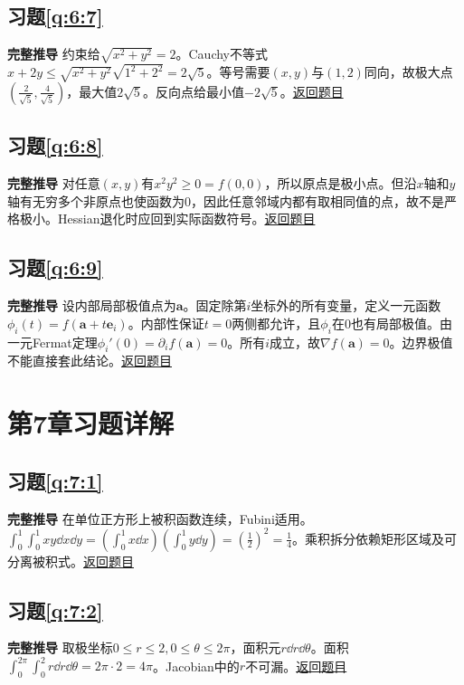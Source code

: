 \subsection*{习题\ref{q:6:7}}\label{a:6:7}\textbf{完整推导} 约束给$\sqrt{x^2+y^2}=2$。Cauchy不等式$x+2y\le\sqrt{x^2+y^2}\sqrt{1^2+2^2}=2\sqrt5$。等号需要$(x,y)$与$(1,2)$同向，故极大点$(\frac{2}{\sqrt5},\frac{4}{\sqrt5})$，最大值$2\sqrt5$。反向点给最小值$-2\sqrt5$。\quad\hyperref[q:6:7]{返回题目}

\subsection*{习题\ref{q:6:8}}\label{a:6:8}\textbf{完整推导} 对任意$(x,y)$有$x^2y^2\ge0=f(0,0)$，所以原点是极小点。但沿$x$轴和$y$轴有无穷多个非原点也使函数为0，因此任意邻域内都有取相同值的点，故不是严格极小。Hessian退化时应回到实际函数符号。\quad\hyperref[q:6:8]{返回题目}

\subsection*{习题\ref{q:6:9}}\label{a:6:9}\textbf{完整推导} 设内部局部极值点为$\bm a$。固定除第$i$坐标外的所有变量，定义一元函数$\phi_i(t)=f(\bm a+t\bm e_i)$。内部性保证$t=0$两侧都允许，且$\phi_i$在0也有局部极值。由一元Fermat定理$\phi_i'(0)=\partial_i f(\bm a)=0$。所有$i$成立，故$\nabla f(\bm a)=0$。边界极值不能直接套此结论。\quad\hyperref[q:6:9]{返回题目}

\section{第7章习题详解}

\subsection*{习题\ref{q:7:1}}\label{a:7:1}\textbf{完整推导} 在单位正方形上被积函数连续，Fubini适用。$\int_0^1\int_0^1xy\dd x\dd y=(\int_0^1x\dd x)(\int_0^1y\dd y)=(\frac{1}{2})^2=\frac{1}{4}$。乘积拆分依赖矩形区域及可分离被积式。\quad\hyperref[q:7:1]{返回题目}

\subsection*{习题\ref{q:7:2}}\label{a:7:2}\textbf{完整推导} 取极坐标$0\le r\le2,0\le\theta\le2\pi$，面积元$r\dd r\dd\theta$。面积$\int_0^{2\pi}\int_0^2r\dd r\dd\theta=2\pi\cdot2=4\pi$。Jacobian中的$r$不可漏。\quad\hyperref[q:7:2]{返回题目}


